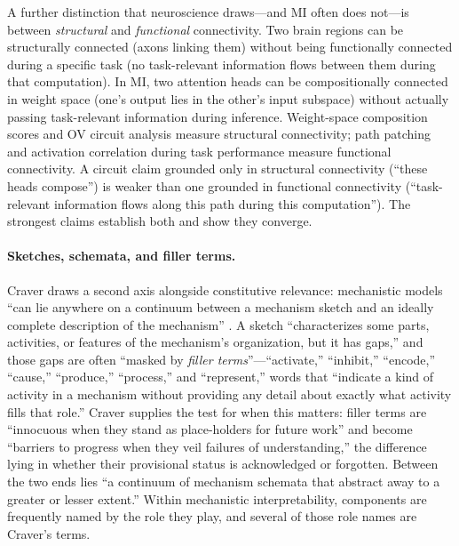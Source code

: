 \documentclass{article}
\begin{document}
A further distinction that neuroscience draws---and MI often does not---is between \emph{structural} and \emph{functional} connectivity. Two brain regions can be structurally connected (axons linking them) without being functionally connected during a specific task (no task-relevant information flows between them during that computation). In MI, two attention heads can be compositionally connected in weight space (one's output lies in the other's input subspace) without actually passing task-relevant information during inference. Weight-space composition scores and OV circuit analysis measure structural connectivity; path patching and activation correlation during task performance measure functional connectivity. A circuit claim grounded only in structural connectivity (``these heads compose'') is weaker than one grounded in functional connectivity (``task-relevant information flows along this path during this computation''). The strongest claims establish both and show they converge.

\paragraph{Sketches, schemata, and filler terms.} Craver draws a second axis alongside constitutive relevance: mechanistic models ``can lie anywhere on a continuum between a mechanism sketch and an ideally complete description of the mechanism'' \citep{craver2007explaining}. A sketch ``characterizes some parts, activities, or features of the mechanism's organization, but it has gaps,'' and those gaps are often ``masked by \emph{filler terms}''---``activate,'' ``inhibit,'' ``encode,'' ``cause,'' ``produce,'' ``process,'' and ``represent,'' words that ``indicate a kind of activity in a mechanism without providing any detail about exactly what activity fills that role.'' Craver supplies the test for when this matters: filler terms are ``innocuous when they stand as place-holders for future work'' and become ``barriers to progress when they veil failures of understanding,'' the difference lying in whether their provisional status is acknowledged or forgotten. Between the two ends lies ``a continuum of mechanism schemata that abstract away to a greater or lesser extent.'' Within mechanistic interpretability, components are frequently named by the role they play, and several of those role names are Craver's terms.
\end{document}
